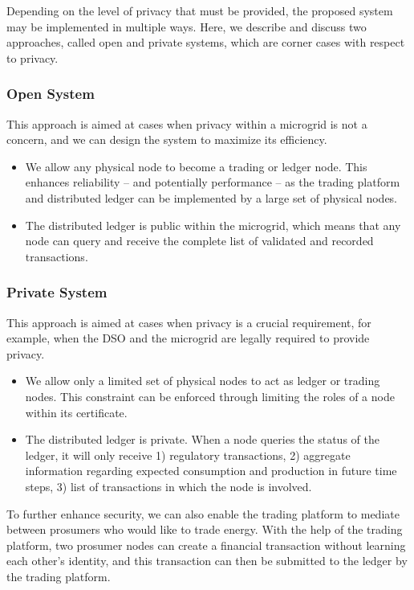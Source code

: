 \documentclass[sigconf]{acmart}
\begin{document}
Depending on the level of privacy that must be provided, the proposed system may be implemented in multiple ways.
Here, we describe and discuss two approaches, called open and private systems, which are corner cases with respect to privacy.

\subsubsection{Open System}
This approach is aimed at cases when privacy within a microgrid is not a concern, and we can design the system to maximize its efficiency.
\begin{itemize}
\item We allow any physical node to become a trading or ledger node. This enhances reliability -- and potentially performance -- as the trading platform and distributed ledger can be implemented by a large set of physical nodes.
\item The distributed ledger is public within the microgrid, which means that any node can query and receive the complete list of validated and recorded transactions.
\end{itemize}

\subsubsection{Private System}
This approach is aimed at cases when privacy is a crucial requirement, for example, when the DSO and the microgrid are legally required to provide privacy.
\begin{itemize}
\item We allow only a limited set of physical nodes to act as ledger or trading nodes. This constraint can be enforced through limiting the roles of a node within its certificate.
\item The distributed ledger is private. When a node queries the status of the ledger, it will only receive 1) regulatory transactions, 2) aggregate information regarding expected consumption and production in future time steps, 3) list of transactions in which the node is involved.
\end{itemize}
To further enhance security, we can also enable the trading platform to mediate between prosumers who would like to trade energy. With the help of the trading platform, two prosumer nodes can create a financial transaction without learning each other's identity, and this transaction can then be submitted to the ledger by the trading platform.
\end{document}
